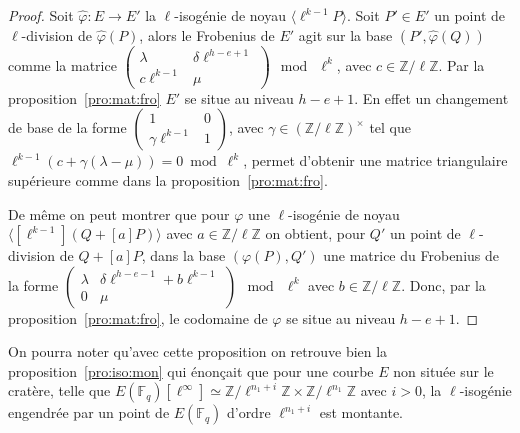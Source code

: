 \documentclass[10pt,a4paper]{book}
\theoremstyle{plain}
\theoremstyle{definition}
\theoremstyle{definition}
\theoremstyle{definition}
\theoremstyle{definition}
\theoremstyle{definition}
\theoremstyle{remark}
\theoremstyle{remark}
\theoremstyle{definition}
\begin{document}
\begin{proof}
Soit $\widehat{\varphi}:E\to E'$ la $\ell$-isogénie de noyau $\langle \ell^{k-1}P 
\rangle$.
Soit $P'\in E'$ un point de $\ell$-division de $\widehat{\varphi}(P)$, alors 
le Frobenius de $E'$ agit sur la base 
$( P',\widehat{\varphi}(Q) )$ comme la matrice $\left( \begin{smallmatrix} \lambda 
& \delta \ell^{h-e+1} \\ c \ell^{k-1} & \mu \end{smallmatrix} \right)~\bmod~\ell^k$, 
avec $c \in \mathbb{Z}/\ell \mathbb{Z}$. Par la 
proposition~\ref{pro:mat:fro} $E'$ se 
 situe au niveau $h-e+1$. En effet un changement de base de la forme $\left( 
\begin{smallmatrix} 1 & 0 \\ \gamma \ell^{k-1} & 1 \end{smallmatrix} \right)$, 
 avec $\gamma \in (\mathbb{Z}/\ell \mathbb{Z})^{\times}$ tel que $\ell^{k-1}(c+
\gamma (\lambda -\mu))=0 \bmod \ell^k$, permet d'obtenir une matrice 
triangulaire supérieure comme dans la
proposition~\ref{pro:mat:fro}.

De même on peut montrer que pour $\varphi$ une $\ell$-isogénie de noyau 
$\langle [\ell^{k-1}](Q+[a]P) \rangle$ avec $a \in \mathbb{Z}/\ell \mathbb{Z}$ 
on obtient, pour $Q'$ un point de $\ell$-division de $Q+[a]P$, dans la base 
$(\varphi(P), Q')$ une matrice du Frobenius de la forme $\left( 
\begin{smallmatrix} \lambda & \delta \ell^{h-e-1}+b\ell^{k-1} \\ 0 & \mu 
\end{smallmatrix} \right)~\bmod~\ell^k$ avec $b \in \mathbb{Z}/\ell 
\mathbb{Z}$.  Donc, par la proposition~\ref{pro:mat:fro}, le codomaine de 
$\varphi$ se situe au niveau $h-e+1$.
\end{proof}


On pourra noter qu'avec cette proposition on retrouve bien la 
proposition~\ref{pro:iso:mon} qui énonçait que pour une courbe $E$ non située
sur le cratère, telle que $E(\mathbb{F}_q)[\ell^{\infty}]\simeq 
\mathbb{Z}/\ell^{n_1+i} \mathbb{Z} \times \mathbb{Z}/\ell^{n_1} \mathbb{Z}$ 
avec $i>0$, la $\ell$-isogénie engendrée par un point de $E(\mathbb{F}_q)$ 
d'ordre $\ell^{n_1+i}$ est montante.
\end{document}
